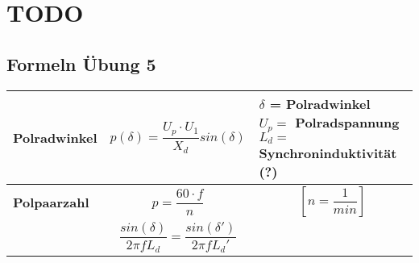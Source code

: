 \section*{TODO}

\subsection*{Formeln Übung 5}
\begin{tabular}[b]{|C{4cm}| P{8cm} | P{5cm}|}
    \hline
    \textbf{Polradwinkel}&
    \[ p(\delta)=\frac{U_p \cdot U_1}{X_d} sin(\delta) \]&
    $ \delta$ = Polradwinkel \newline
    $ U_p = $ Polradspannung \newline
    $ L_d =$ Synchroninduktivität (?)
    \\ \hline
    
    \textbf{Polpaarzahl}&
    \[ p=\frac{60 \cdot f}{n} \] &
    \[ \left[n= \frac{1}{min}\right] \]
    \\ \hline
    
    &
    \[  \frac{sin(\delta)}{2\pi f L_d}=\frac{sin(\delta ')}{2\pi f L_d '} \] &
    \\ \hline       
\end{tabular}
\clearpage
\pagebreak
